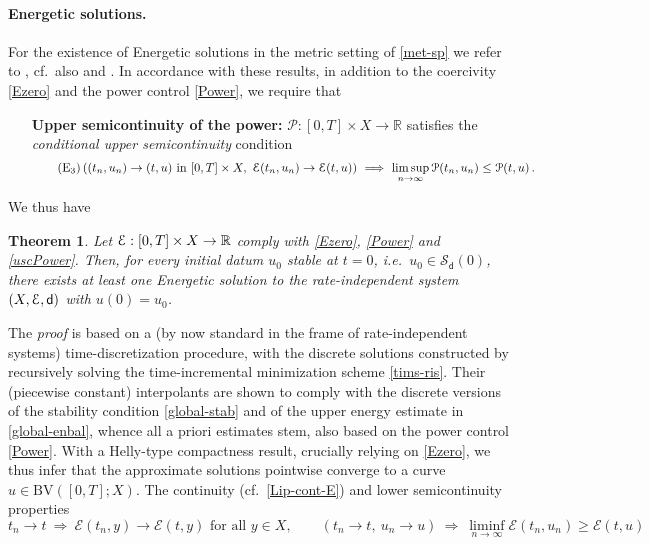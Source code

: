 \documentclass[a4paper,10pt,reqno]{amsart} %
\newcommand{\R}{\mathbb{R}}
\newtheorem{theorem}{Theorem}[section]
\numberwithin{equation}{section}
\newcommand{\Xs}{X}
\newcommand{\BV}{\mathrm{BV}}
\newcommand{\mdn}{\mathsf{d}}
\newcommand{\ene}[2]{\mathcal{E}(#1,#2)}
\newcommand{\pwn}{\mathcal{P}}
\newcommand{\pw}[2]{\mathcal{P}(#1,#2)}
\newcommand{\RIS}{(\Xs,\calE,\mdn)}
\newcommand{\stabi}[2]{\mathscr{S}_{#1}(#2)}
\begin{document}
\paragraph{\bf Energetic solutions.} For the existence of Energetic solutions in the metric setting of \eqref{met-sp} we refer to \cite[Thm.\ 4.5]{MaiMie05EREM}, cf.\ also \cite{Miel05ERIS} and \cite[Sec.\ 2.1]{MieRouBOOK}.  In accordance with these results,
in addition  to the coercivity \eqref{Ezero} and the   power control \eqref{Power},   we require that
\begin{itemize}
\item[\textbf{Upper semicontinuity of the power:}]
$\pwn :[0,T]\times \Xs \to \R$ satisfies the \emph{conditional upper semicontinuity} condition
\begin{equation}
\label{uscPower}
\tag{$\mathrm{E}_3$}
\left( (t_n,u_n)\to(t,u) \text{ in } [0,T]\times \Xs, \ \ene {t_n}{u_n}\to \ene tu \right) \ \Longrightarrow \ \limsup_{n\to\infty} \pw {t_n}{u_n}\leq \pw tu\,.
\end{equation}
\end{itemize}
  We thus have 
  \begin{theorem}
  \label{th:ex-en}
  Let $\calE: [0,T]\times \Xs \to \R$ comply with  \eqref{Ezero}, \eqref{Power} and \eqref{uscPower}. Then, for every  initial datum $u_0$ stable at $t=0$, i.e.\ $u_0 \in \stabi \mdn 0$, there exists at least one Energetic solution to the rate-independent system $\RIS$ with $u(0)=u_0$.
  \end{theorem}
  The \emph{proof} is based on a (by now standard in the frame of rate-independent systems)
  time-discretization procedure, with the discrete solutions 
  constructed by recursively solving the time-incremental minimization scheme \eqref{tims-ris}. 
  Their (piecewise constant) interpolants are shown to comply with the discrete versions of the stability condition \eqref{global-stab} and of the upper energy estimate in \eqref{global-enbal}, whence all a priori estimates  stem, also based on the power control \eqref{Power}. With a Helly-type compactness result, crucially relying on   \eqref{Ezero}, we  thus infer that the approximate solutions pointwise converge to a curve $u\in \BV([0,T];X)$. 
  The continuity
  (cf.\ \eqref{Lip-cont-E}) and 
    lower semicontinuity   
  properties   \begin{equation}
\label{4closure-stable-set}
t_n \to t \ \Rightarrow \   \ene {t_n}y \to \ene ty \text{ for all } y\in \Xs, \qquad \left( t_n  \to t, \ u_n \to u \right) \ \Rightarrow \ \liminf_{n\to\infty} 
 \ene {t_n}{u_n} \geq \ene tu 
  \end{equation}
\end{document}
